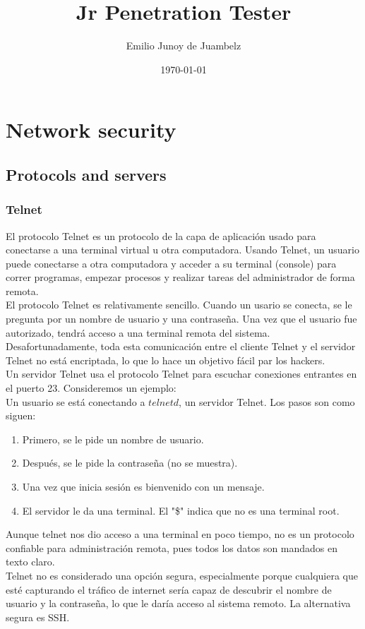 \documentclass[12pt]{report}
\title{Jr Penetration Tester}
\author{Emilio Junoy de Juambelz}
\date{\today}
\begin{document}
\chapter{Network security}

\section{Protocols and servers}

\subsection{Telnet}
El protocolo Telnet es un protocolo de la capa de aplicación
usado para conectarse a una terminal virtual u otra computadora.
Usando Telnet, un usuario puede conectarse a otra computadora y 
acceder a su terminal (console) para correr programas, empezar
procesos y realizar tareas del administrador de forma remota.\\

El protocolo Telnet es relativamente sencillo. Cuando un usario 
se conecta, se le pregunta por un nombre de usuario y una 
contraseña. Una vez que el usuario fue autorizado, tendrá acceso
a una terminal remota del sistema. Desafortunadamente, toda esta 
comunicación entre el cliente Telnet y el servidor Telnet no
está encriptada, lo que lo hace un objetivo fácil par los hackers.\\

Un servidor Telnet usa el protocolo Telnet para escuchar conexiones
entrantes en el puerto 23. Consideremos un ejemplo:\\
Un usuario se está conectando a $\textit{telnetd}$, un servidor
Telnet. Los pasos son como siguen:
\begin{enumerate}
  \item Primero, se le pide un nombre de usuario.
  \item Después, se le pide la contraseña (no se muestra).
  \item Una vez que inicia sesión es bienvenido con un mensaje.
  \item El servidor le da una terminal. El "\$" indica que no es
    una terminal root.
\end{enumerate}
Aunque telnet nos dio acceso a una terminal en poco tiempo, no
es un protocolo confiable para administración remota, pues todos
los datos son mandados en texto claro.\\
Telnet no es considerado una opción segura, especialmente porque
cualquiera que esté capturando el tráfico de internet sería capaz
de descubrir el nombre de usuario y la contraseña, lo que le daría
acceso al sistema remoto. La alternativa segura es SSH.
\end{document}
